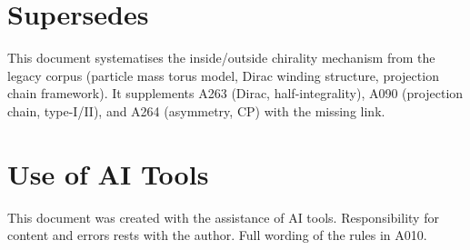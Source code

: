 \section{Supersedes}

This document systematises the inside/outside chirality mechanism from the
legacy corpus (particle mass torus model, Dirac winding structure, projection
chain framework). It supplements A263 (Dirac, half-integrality), A090
(projection chain, type-I/II), and A264 (asymmetry, CP) with the missing link.

\section{Use of AI Tools}

This document was created with the assistance of AI tools.
Responsibility for content and errors rests with the author.
Full wording of the rules in A010.
